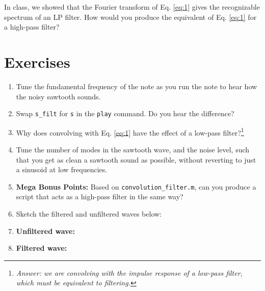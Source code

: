 \documentclass[10.5pt]{article}
\begin{document}
In class, we showed that the Fourier transform of Eq. \ref{eq:1} gives the recognizable spectrum of an LP filter.  How would you produce the equivalent of Eq. \ref{eq:1} for a high-pass filter?

\section{Exercises}

\begin{enumerate}
\item Tune the fundamental frequency of the note as you run the note to hear how the noisy sawtooth sounds.
\item Swap \verb+s_filt+ for \verb+s+ in the \verb+play+ command.  Do you hear the difference?
\item Why does convolving with Eq. \ref{eq:1} have the effect of a low-pass filter?\footnote{\textit{Answer: we are convolving with the impulse response of a low-pass filter, which must be equivalent to filtering.}}
\item Tune the number of modes in the sawtooth wave, and the noise level, such that you get as clean a sawtooth sound as possible, without reverting to just a sinusoid at low frequencies.
\item \textbf{Mega Bonus Points:} Based on \verb+convolution_filter.m+, can you produce a script that acts as a high-pass filter in the same way?
\item Sketch the filtered and unfiltered waves below:
\item \textbf{Unfiltered wave:} \\ \vspace{4cm}
\item \textbf{Filtered wave:} \\ \vspace{4cm}
\end{enumerate}
\end{document}
